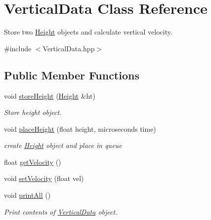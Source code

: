 \hypertarget{classVerticalData}{\section{Vertical\+Data Class Reference}
\label{classVerticalData}
}


Store two \hyperlink{classHeight}{Height} objects and calculate vertical velocity.  




{\ttfamily \#include $<$Vertical\+Data.\+hpp$>$}

\subsection*{Public Member Functions}
\begin{DoxyCompactItemize}
\item 
void \hyperlink{classVerticalData_a50b355687804c6d9b03e90bce2a3095e}{store\+Height} (\hyperlink{classHeight}{Height} \&ht)
\begin{DoxyCompactList}\small\item\em Store height object. \end{DoxyCompactList}\item 
void \hyperlink{classVerticalData_aef83569982446e500bd333c8a85b6f3a}{place\+Height} (float height, microseconds time)
\begin{DoxyCompactList}\small\item\em create \hyperlink{classHeight}{Height} object and place in queue \end{DoxyCompactList}\item 
float \hyperlink{classVerticalData_a6de4f8e0da7c7b31072c4a078b62d063}{get\+Velocity} ()
\item 
void \hyperlink{classVerticalData_a33097c244e4c8b4693aaecb60942fe41}{set\+Velocity} (float vel)
\item 
\hypertarget{classVerticalData_aa0e879c93866136cdfa2f8130b5eac17}{void \hyperlink{classVerticalData_aa0e879c93866136cdfa2f8130b5eac17}{print\+All} ()}\label{classVerticalData_aa0e879c93866136cdfa2f8130b5eac17}

\begin{DoxyCompactList}\small\item\em Print contents of \hyperlink{classVerticalData}{Vertical\+Data} object. \end{DoxyCompactList}\end{DoxyCompactItemize}
